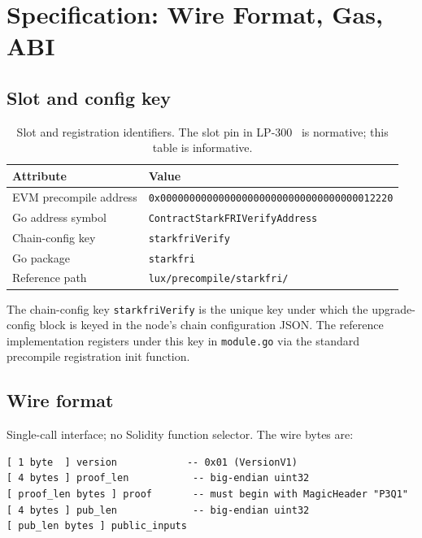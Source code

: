 \section{Specification: Wire Format, Gas, ABI}
\label{sec:specification}

\subsection{Slot and config key}

\begin{table}[h]
\centering
\small
\begin{tabular}{@{}ll@{}}
\toprule
\textbf{Attribute} & \textbf{Value} \\
\midrule
EVM precompile address & \texttt{0x0000000000000000000000000000000000012220} \\
Go address symbol & \texttt{ContractStarkFRIVerifyAddress} \\
Chain-config key & \texttt{starkfriVerify} \\
Go package & \texttt{starkfri} \\
Reference path & \texttt{lux/precompile/starkfri/} \\
\bottomrule
\end{tabular}
\caption{Slot and registration identifiers. The slot pin in
LP-300~\cite{lp300} is normative; this table is informative.}
\label{tab:slot-id}
\end{table}

The chain-config key \texttt{starkfriVerify} is the unique key under
which the upgrade-config block is keyed in the node's chain
configuration JSON. The reference implementation registers under
this key in \texttt{module.go} via the standard precompile
registration init function.

\subsection{Wire format}

Single-call interface; no Solidity function selector. The wire bytes
are:

\begin{lstlisting}[language={}]
[ 1 byte  ] version            -- 0x01 (VersionV1)
[ 4 bytes ] proof_len           -- big-endian uint32
[ proof_len bytes ] proof       -- must begin with MagicHeader "P3Q1"
[ 4 bytes ] pub_len             -- big-endian uint32
[ pub_len bytes ] public_inputs
\end{lstlisting}

